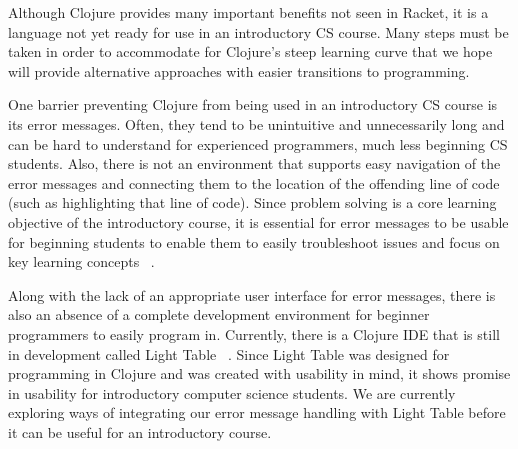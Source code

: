 \documentclass[12pt]{article}
\newcommand{\comment}[1]{{\bf \tt  {#1}}}
\newcommand{\emcomment}[1]{\textcolor{ForestGreen}{\comment{Elena: {#1}}}}
\newcommand{\pscomment}[1]{\textcolor{red}{\comment{Paul: {#1}}}}
\newcommand{\mmcomment}[1]{\textcolor{magenta}{\comment{Max: {#1}}}}
\begin{document}
Although Clojure provides many important benefits not seen in Racket, it is a language not yet ready for use in an introductory CS course. Many steps must be taken in order to accommodate for Clojure's steep learning curve that we hope will provide alternative approaches with easier transitions to programming.

One barrier preventing Clojure from being used in an introductory CS course is its error messages. Often, they tend to be unintuitive and unnecessarily long and can be hard to understand for experienced programmers, much less beginning CS students. Also, there is not an environment that supports easy navigation of the error messages and connecting them to the location of the offending line of code (such as highlighting that line of code). Since problem solving is a core learning objective of the introductory course, it is essential for error messages to be usable for beginning students to enable them to easily troubleshoot issues and focus on key learning concepts ~\cite{tfpie2014}.

Along with the lack of an appropriate user interface for error messages, there is also an absence of a complete development environment for beginner programmers to easily program in. %
Currently, there is a Clojure IDE that is still in development called Light Table ~\cite{lightTable}. Since Light Table was designed for programming in Clojure and was created with usability in mind, it shows promise in usability for introductory computer science students. We are currently exploring ways of integrating our error message handling with Light Table before it can be useful for an introductory course.
\end{document}
